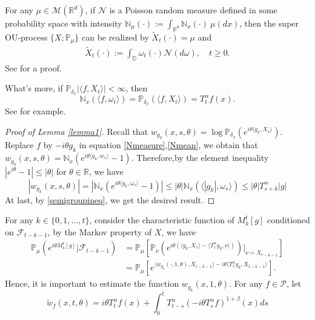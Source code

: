 \documentclass{article}
\begin{document}
For any $\mu \in \mathcal{M}(\mathbb{R}^d)$, if $\mathcal{N}$ is a Poisson random measure defined in some probability space with intensity $\mathbb{N}_{\mu}(\cdot):=\int_{\mathbb{R}^d}\mathbb{N}_x(\cdot)~\mu(dx)$, then the super OU-process $\{X;\mathbb{P}_{\mu}\}$ can be realized by $\tilde{X}_t(\cdot)=\mu$ and
\begin{align*}
    \tilde{X}_t(\cdot):=\int_{\mathbb{D}}\omega_t(\cdot)\mathcal{N}(d\omega), \quad t\geq 0.
\end{align*}
See \cite[Theorem 8.24]{ZL} for a proof.

What's more, if $\mathbb{P}_{\delta_x}|\langle f, X_t\rangle|<\infty$, then
\begin{equation}\label{Nmean}
    \mathbb{N}_x(\langle f,\omega_t \rangle) = \mathbb{P}_{\delta_x}(\langle f, X_t\rangle)=T^{\alpha}_t f(x).
\end{equation}
See \cite[Lemma 3.3]{RSS} for example.

\begin{proof}[Proof of Lemma \ref{lemma1}]

Recall that $w_{g_k}(x,s,\theta)=\log\mathbb{P}_{\delta_x}(e^{i\theta \langle g_k, X_s \rangle})$.
Replace $f$ by $-i\theta g_k$ in equation \eqref{Nmeasure},\eqref{Nmean}, we obtain that $w_{g_k}(x,s,\theta)=\mathbb{N}_x\left(e^{i\theta\langle g_k,w_s\rangle}-1\right)$.
Therefore,by the element inequality $|e^{i\theta}-1|\leq|\theta|$ for $\theta \in \mathbb{R}$, we have 
$$|w_{g_k}(x,s,\theta)|=|\mathbb{N}_x(e^{i\theta\langle g_{k},\omega_s \rangle}-1)|\leq |\theta|\mathbb{N}_x(\langle|g_k|,\omega_s\rangle)\leq|\theta|T_{s+k}^{\alpha}|g|$$
At last, by \eqref{semigroupineq}, we get the desired result.
\end{proof}
 For any $k \in \{0,1,...,t\}$, consider the characteristic function of $M^t_k[g]$ conditioned on $\mathcal{F}_{t-k-1}$, by the Markov property of $X$, we have
 \begin{align*}
      \mathbb{P}_{\mu}(e^{i\theta M_k^t[g]}|\mathcal{F}_{t-k-1}) &=\mathbb{P_{\mu}}\left [\mathbb{P}_{\nu}\left(e^{i\theta(\langle g_k,X_1\rangle-\langle T_1^{\alpha}g_k,\nu\rangle)}\right)|_{\nu=X_{t-k-1}}\right]   \\
      &=\mathbb{P}_{\mu}\left[ e^{\langle w_{g_k}(\cdot,1,\theta),X_{t-k-1}\rangle -i \theta\langle T_1^{\alpha}g_k,X_{t-k-1}\rangle}\right].
 \end{align*}
Hence, it is important to estimate the function $w_{g_k}(x,1,\theta)$. For any $f \in \mathcal{P}$, let 
\begin{equation}\label{w2function}
    \tilde{w}_{f}(x,t,\theta)=i\theta T^{\alpha}_t f(x) + \int_0^t T^{\alpha}_{t-s}(-i\theta T_s^{\alpha}f)^{1+\beta}(x)ds
\end{equation}
\end{document}
